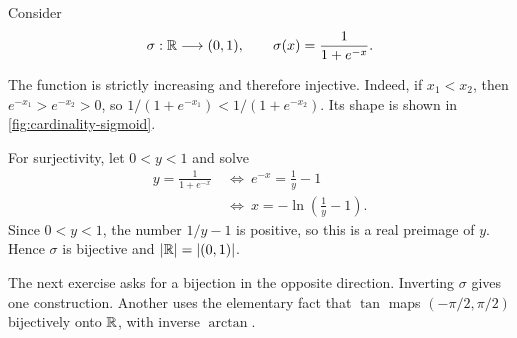 \begin{example}
  \label{ex:analysis-i:sigmoid-bijection}
  Consider
  \[
    \sigma:\mathbb{R}\longrightarrow(0,1),\qquad
    \sigma(x)=\frac1{1+e^{-x}}.
  \]
  \begin{marginfigure}
    \centering
    
    \caption[A bijection from the real line to an open interval.]{%
      The sigmoid $\sigma(x)=1/(1+e^{-x})$ passes
      through $(0,1/2)$ and approaches $0$ and $1$ without attaining
      either value.}
    \label{fig:cardinality-sigmoid}
  \end{marginfigure}

  The function is strictly increasing and therefore injective.
  Indeed, if $x_1<x_2$, then
  $e^{-x_1}>e^{-x_2}>0$, so
  $1/(1+e^{-x_1})<1/(1+e^{-x_2})$.
  Its shape is shown in
  \autoref{fig:cardinality-sigmoid}.

  For surjectivity, let $0<y<1$ and solve
  \begin{align*}
    y=\frac1{1+e^{-x}}
      &\ \Longleftrightarrow\ e^{-x}=\frac1y-1\\
      &\ \Longleftrightarrow\ x=-\ln\left(\frac1y-1\right).
  \end{align*}
  Since $0<y<1$, the number $1/y-1$ is positive, so this is a real
  preimage of $y$. Hence $\sigma$ is bijective and
  $|\mathbb{R}|=|(0,1)|$.
\end{example}


The next exercise asks for a bijection in the opposite direction.
Inverting $\sigma$ gives one construction. Another uses the elementary
fact that $\tan$ maps $(-\pi/2,\pi/2)$ bijectively onto $\mathbb{R}$, with
inverse $\arctan$.



